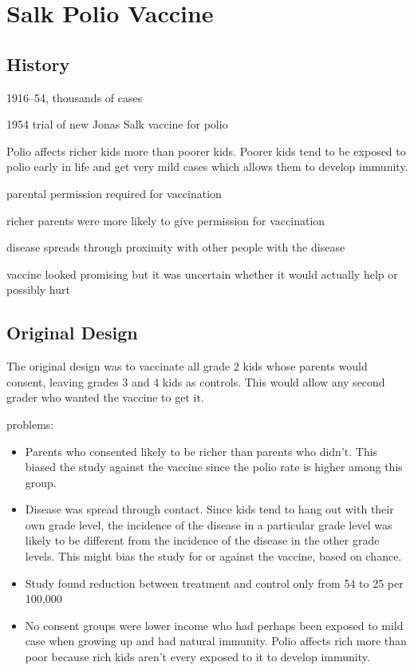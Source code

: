 \documentclass[landscape]{exam}
\begin{document}
  \section{Salk Polio Vaccine}

  \subsection{History}
  \begin{itemize*}
    \item 1916--54, thousands of cases
    \item 1954 trial of new Jonas Salk vaccine for polio
    \item Polio affects richer kids more than poorer kids. Poorer kids tend to
      be exposed to polio early in life and get very mild cases which allows
      them to develop immunity.
    \item parental permission required for vaccination
    \item richer parents were more likely to give permission for vaccination
    \item disease spreads through proximity with other people with the disease
    \item vaccine looked promising but it was uncertain whether it would
      actually help or possibly hurt
  \end{itemize*}

  \subsection{Original Design}
  The original design was to vaccinate all grade 2 kids whose parents would
  consent, leaving grades 3 and 4 kids as controls.  This would allow any second
  grader who wanted the vaccine to get it.

  problems:
  \begin{itemize}

    \item Parents who consented likely to be richer than parents who didn't.
      This biased the study against the vaccine since the polio rate is higher
      among this group.

    \item Disease was spread through contact.  Since kids tend to hang out with
      their own grade level, the incidence of the disease in a particular grade
      level was likely to be different from the incidence of the disease in the
      other grade levels. This might bias the study for or against the vaccine,
      based on chance.

    \item Study found reduction between treatment and control only from 54 to 25
      per 100,000

    \item No consent groups were lower income who had perhaps been exposed to
      mild case when growing up and had natural immunity. Polio affects rich
      more than poor because rich kids aren't every exposed to it to develop
      immunity.
  \end{itemize}
\end{document}
